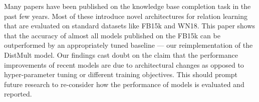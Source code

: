 Many papers have been published on the knowledge base completion task in the past few years. Most of these introduce novel architectures for relation learning that are evaluated on standard datasets like FB15k and WN18. This paper shows that the accuracy of almost all models published on the FB15k can be outperformed by an appropriately tuned baseline --- our reimplementation of the DistMult model. Our findings cast doubt on the claim that the performance improvements of recent models are due to architectural changes as opposed to hyper-parameter tuning or different training objectives. This should prompt future research to re-consider how the performance of models is evaluated and reported.
